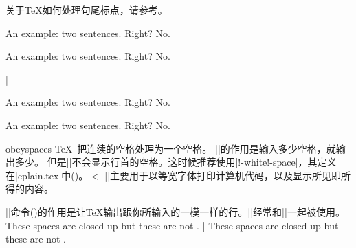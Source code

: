 %
%


关于\TeX{}如何处理句尾标点，请参考。
\example
{\frenchspacing  An example: two sentences. Right? No.\par}
{An example: two sentences. Right? No. \par}%
|
\produces
{\frenchspacing  An example: two sentences. Right? No.\par}
{An example: two sentences. Right? No. \par}%
\endexample

\enddesc
%
%

\begindesc
\cts obeyspaces {}
\explain
\TeX\ 把连续的空格处理为一个空格。
|\obeyspaces|的作用是输入多少空格，就输出多少。
但是|\obeyspaces|不会显示行首的空格。这时候推荐使用|\obey!-white!-space|，其定义在|eplain.tex|中()。
^^|\obeywhitespace|
|\obeyspaces|主要用于以等宽字体打印计算机代码，以及显示所见即所得的内容。


|\obeylines|命令(\xref{\obeylines})的作用是让\TeX{}输出跟你所输入的一模一样的行。|\obeylines|经常和|\obeyspaces|一起被使用。
\example
These     spaces    are    closed   up
{\obeyspaces but   these  are     not   }.
|
\produces
These     spaces    are    closed   up
{\obeyspaces but   these  are     not   }.
\endexample
\enddesc

